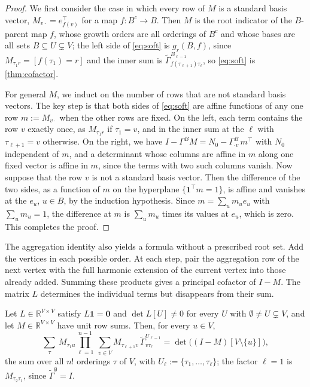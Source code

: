 \documentclass[onefignum,onetabnum]{siamart250211}
\numberwithin{theorem}{section}
\numberwithin{equation}{section}
\newcommand{\R}{\mathbb{R}}
\newcommand{\one}{\mathbf{1}}
\newcommand{\zero}{\mathbf{0}}
\begin{document}
\begin{proof}
We first consider the case in which every row of $M$ is a standard
basis vector, $M_{v\cdot}=e_{f(v)}^{\top}$ for a map $f:B^c\to B$. Then $M$ is the root
indicator of the $B$-parent map $f$, whose growth orders are all
orderings of $B^c$ and whose bases are all sets $B\subseteq U\subsetneq V$;
the left side of \eqref{eq:soft} is $g_r(B,f)$, since
$M_{\tau_1r}=[f(\tau_1)=r]$
and the inner sum is
$\tilde\Gamma^{B_{\ell-1}}_{f(\tau_{\ell+1})\tau_\ell}$,
so \eqref{eq:soft} is \cref{thm:cofactor}.

For general $M$, we induct on the number of rows that are not standard
basis vectors. The key step is that both sides of \eqref{eq:soft} are affine
functions of any one row $m:=M_{v\cdot}$ when the other rows are fixed.
On the left, each term contains the row $v$ exactly once, as
$M_{\tau_1r}$ if $\tau_1=v$, and in the inner sum at the $\ell$ with
$\tau_{\ell+1}=v$ otherwise. On the right, we have
$I-\Gamma^BM=N_0-\Gamma^B_{\cdot v}\,m^{\top}$ with $N_0$ independent of
$m$, and a determinant whose columns are affine in $m$ along one fixed
vector is affine in $m$, since the terms with two such columns vanish.
Now suppose that the row $v$ is not a standard basis vector. Then the
difference of the two sides, as a function of $m$ on the hyperplane
$\{\one^{\top}m=1\}$, is affine and vanishes at the $e_u$, $u\in B$, by
the induction hypothesis. Since $m=\sum_um_ue_u$ with $\sum_um_u=1$, the
difference at $m$ is $\sum_um_u$ times its values at $e_u$, which is
zero. This completes the proof.
\end{proof}

The aggregation identity also yields a formula without a prescribed
root set. Add the vertices in each possible order. At each step,
pair the aggregation row of the next vertex with the full harmonic
extension of the current vertex into those already added.
Summing these products gives a principal cofactor of $I-M$.
The matrix $L$ determines the individual terms but disappears from
their sum.

\begin{proposition}\label{prop:reduced}
Let $L\in\R^{V\times V}$ satisfy $L\one=\zero$ and $\det L[U]\ne0$ for
every $U$ with $\emptyset\ne U\subsetneq V$, and let $M\in\R^{V\times V}$
have unit row sums. Then, for every $u\in V$,
\begin{equation}\label{eq:reduced}
\sum_{\tau}\ M_{\tau_1 u}\prod_{\ell=1}^{n-1}\
\sum_{v\in V}M_{\tau_{\ell+1}v}\,\tilde\Gamma^{U_{\ell-1}}_{v\tau_\ell}
=\det\big((I-M)[V\setminus\{u\}]\big),
\end{equation}
the sum over all $n!$ orderings $\tau$ of $V$, with
$U_\ell:=\{\tau_1,\dots,\tau_\ell\}$; the factor $\ell=1$ is $M_{\tau_2\tau_1}$,
since $\tilde\Gamma^{\emptyset}=I$.
\end{proposition}
\end{document}
